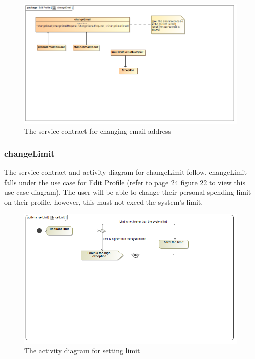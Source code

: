 \documentclass[a4paper,12pt]{article}
\begin{document}
\begin{figure}[H]
	\centering
	\includegraphics[width=1.0\textwidth]{../Diagrams/ManageProfile/serviceContracts/changeEmailServiceContract.png}
	\caption{The service contract for changing email address}
\end{figure}

\subsubsection{changeLimit}
The service contract and activity diagram for changeLimit follow. changeLimit falls under the use case for Edit Profile (refer to page 24 figure 22 to view this use case diagram). The user will be able to change their personal spending limit on their profile, however, this must not exeed the system's limit.
\begin{figure}[H]
  \centering
    \includegraphics[width=1.0\textwidth]{../Diagrams/ManageProfile/ActivityDiagrams/setLimit.png}
    \caption{The activity diagram for setting limit} 
\end{figure}
\end{document}

